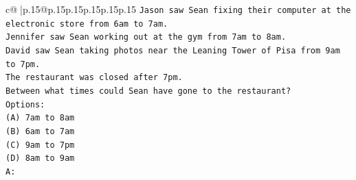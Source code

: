 \documentclass{article}
\begin{document}
{\begin{supertabular}{c@{$\;$}|p{.15\linewidth}@{}p{.15\linewidth}p{.15\linewidth}p{.15\linewidth}p{.15\linewidth}p{.15\linewidth}}
{{{\texttt{Jason saw Sean fixing their computer at the electronic store from 6am to 7am.} \\
\texttt{Jennifer saw Sean working out at the gym from 7am to 8am.} \\
\texttt{David saw Sean taking photos near the Leaning Tower of Pisa from 9am to 7pm.} \\
\texttt{The restaurant was closed after 7pm.} \\
\texttt{Between what times could Sean have gone to the restaurant?} \\
\texttt{Options:} \\
\texttt{(A) 7am to 8am} \\
\texttt{(B) 6am to 7am} \\
\texttt{(C) 9am to 7pm} \\
\texttt{(D) 8am to 9am} \\
\texttt{A:} \\
            }
        }
    }
     \\ \\


\end{supertabular}}
\end{document}
